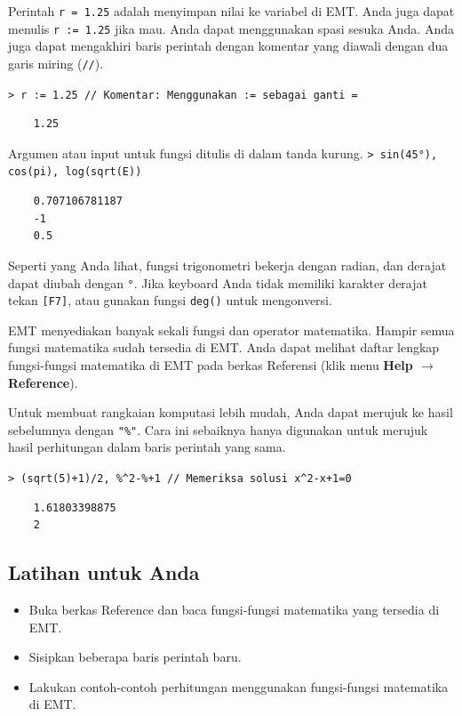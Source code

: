 \documentclass[11pt, a4paper]{article}
\newcommand{\emtcmd}[1]{\noindent\texttt{\textcolor{emtcommand}{>}\ #1}\par\smallskip}
\begin{document}
Perintah \texttt{r = 1.25} adalah menyimpan nilai ke variabel di EMT. Anda juga dapat menulis \texttt{r := 1.25} jika mau. Anda dapat menggunakan spasi sesuka Anda. Anda juga dapat mengakhiri baris perintah dengan komentar yang diawali dengan dua garis miring (\texttt{//}).

\emtcmd{r := 1.25 \textcolor{emtcomment}{// Komentar: Menggunakan := sebagai ganti =}}
\begin{verbatim}
    1.25
\end{verbatim}

Argumen atau input untuk fungsi ditulis di dalam tanda kurung.
\emtcmd{sin(45°), cos(pi), log(sqrt(E))}
\begin{verbatim}
    0.707106781187
    -1
    0.5
\end{verbatim}

Seperti yang Anda lihat, fungsi trigonometri bekerja dengan radian, dan derajat dapat diubah dengan \texttt{°}. Jika keyboard Anda tidak memiliki karakter derajat tekan \texttt{[F7]}, atau gunakan fungsi \texttt{deg()} untuk mengonversi.

EMT menyediakan banyak sekali fungsi dan operator matematika. Hampir semua fungsi matematika sudah tersedia di EMT. Anda dapat melihat daftar lengkap fungsi-fungsi matematika di EMT pada berkas Referensi (klik menu \textbf{Help $\rightarrow$ Reference}).

Untuk membuat rangkaian komputasi lebih mudah, Anda dapat merujuk ke hasil sebelumnya dengan \texttt{"\%"}. Cara ini sebaiknya hanya digunakan untuk merujuk hasil perhitungan dalam baris perintah yang sama.

\emtcmd{(sqrt(5)+1)/2, \%\^{}2-\%+1 \textcolor{emtcomment}{// Memeriksa solusi x\^{}2-x+1=0}}
\begin{verbatim}
    1.61803398875
    2
\end{verbatim}

\subsection*{Latihan untuk Anda}

\begin{itemize}
    \item Buka berkas Reference dan baca fungsi-fungsi matematika yang tersedia di EMT.
    \item Sisipkan beberapa baris perintah baru.
    \item Lakukan contoh-contoh perhitungan menggunakan fungsi-fungsi matematika di EMT.
\end{itemize}
\end{document}
